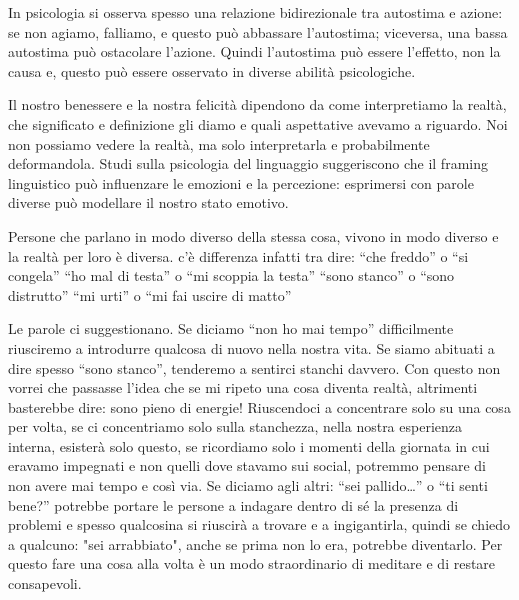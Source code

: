 \documentclass[12pt]{book} %
\begin{document}
In psicologia si osserva spesso una relazione bidirezionale tra autostima e azione: se non agiamo, falliamo, e questo può abbassare l’autostima; viceversa, una bassa autostima può ostacolare l’azione. Quindi l'autostima può essere l'effetto, non la causa e, questo può essere osservato in diverse abilità psicologiche.

Il nostro benessere e la nostra felicità dipendono da come interpretiamo la realtà, che significato e definizione gli
diamo e quali aspettative avevamo a riguardo. Noi non possiamo vedere la realtà, ma solo interpretarla e probabilmente deformandola. Studi sulla psicologia del linguaggio suggeriscono che il framing linguistico può influenzare le emozioni e la percezione: esprimersi con parole diverse può modellare il nostro stato emotivo.

Persone che parlano in modo diverso della stessa cosa, vivono in modo diverso e la realtà per loro è diversa. c'è
differenza infatti tra dire:\newline
“che freddo” o “si congela”\newline
“ho mal di testa” o “mi scoppia la testa”\newline
“sono stanco” o “sono distrutto”\newline
“mi urti” o “mi fai uscire di matto”

Le parole ci suggestionano. Se diciamo “non ho mai tempo” difficilmente riusciremo a introdurre qualcosa di nuovo nella nostra vita.
Se siamo abituati a dire spesso “sono stanco”, tenderemo a sentirci stanchi davvero. Con questo non vorrei che passasse l'idea che se mi ripeto una cosa diventa realtà, altrimenti basterebbe dire: sono pieno di energie! Riuscendoci a concentrare solo su una cosa per volta, se ci concentriamo solo sulla stanchezza, nella nostra esperienza interna, esisterà solo questo, se ricordiamo solo i momenti della giornata in cui eravamo impegnati e non quelli dove stavamo sui social, potremmo pensare di non avere mai tempo e così via. Se diciamo agli altri: “sei pallido…” o “ti senti bene?” potrebbe portare le persone a indagare dentro di sé la presenza di problemi e spesso qualcosina si riuscirà a trovare e a ingigantirla, quindi se chiedo a qualcuno: "sei arrabbiato", anche se prima non lo era, potrebbe diventarlo. Per questo fare una cosa alla volta è un modo straordinario di meditare e di restare consapevoli.
\end{document}
